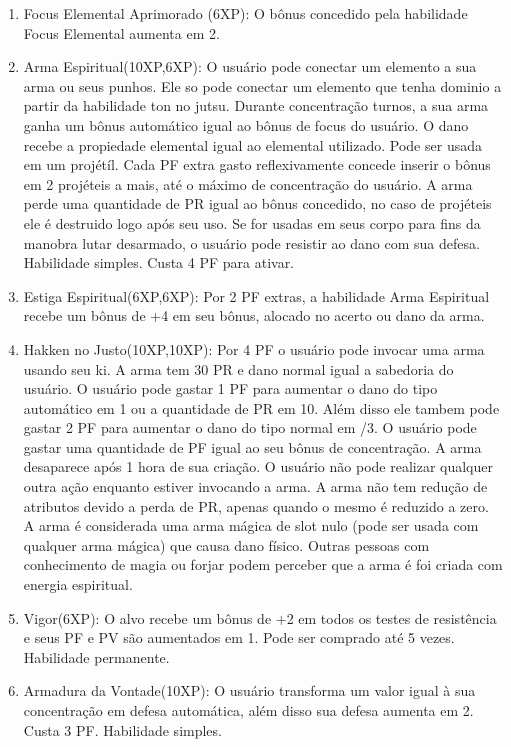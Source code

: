 \begin{enumerate}
 	\item Focus Elemental Aprimorado (6XP): O bônus concedido pela habilidade Focus Elemental aumenta em 2.
		
	\item Arma Espiritual(10XP,6XP): O usuário pode conectar um elemento a sua arma ou seus punhos. Ele so pode conectar um elemento que tenha dominio a partir da habilidade ton no jutsu. Durante concentração turnos, a sua arma ganha um bônus automático igual ao bônus de focus do usuário. O dano recebe a propiedade elemental igual ao elemental utilizado. Pode ser usada em um projétíl. Cada PF extra gasto reflexivamente concede inserir o bônus em 2 projéteis a mais, até o máximo de concentração do usuário. A arma perde uma quantidade de PR igual ao bônus concedido, no caso de projéteis ele é destruido logo após seu uso. Se for usadas em seus corpo para fins da manobra lutar desarmado, o usuário pode resistir ao dano com sua defesa. Habilidade simples. Custa 4 PF para ativar.

\item Estiga Espiritual(6XP,6XP): Por 2 PF extras, a habilidade Arma Espiritual recebe um bônus de +4 em seu bônus, alocado no acerto ou dano da arma.

\item Hakken no Justo(10XP,10XP): Por 4 PF o usuário pode invocar uma arma usando seu ki. A arma tem 30 PR e dano normal igual a sabedoria do usuário. O usuário pode gastar 1 PF para aumentar o dano do tipo automático em 1 ou a quantidade de PR em 10. Além disso ele tambem pode gastar 2 PF para aumentar o dano do tipo normal em /3. O usuário pode gastar uma quantidade de PF igual ao seu bônus de concentração. A arma desaparece após 1 hora de sua criação. O usuário não pode realizar qualquer outra ação enquanto estiver invocando a arma. A arma não tem redução de atributos devido a perda de PR, apenas quando o mesmo é reduzido a zero. A arma é considerada uma arma mágica de slot nulo (pode ser usada com qualquer arma mágica) que causa dano físico. Outras pessoas com conhecimento de magia ou forjar podem perceber que a arma é foi criada com energia espiritual.

	\item Vigor(6XP): O alvo recebe um bônus de +2 em todos os testes de resistência e seus PF e PV são aumentados em 1. Pode ser comprado até 5 vezes. Habilidade permanente.

	\item Armadura da Vontade(10XP): O usuário transforma um valor igual à sua concentração em defesa automática, além disso sua defesa aumenta em 2. Custa 3 PF. Habilidade simples.


\end{enumerate}
